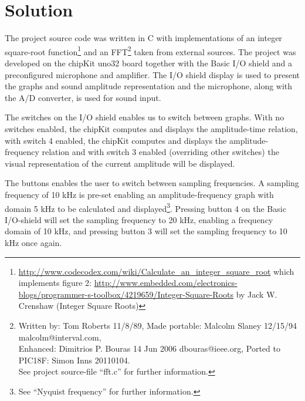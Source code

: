 \documentclass[a4paper,11pt]{article}
\begin{document}
\section*{Solution}
The project source code was written in C with implementations of an integer square-root function\footnote{\url{http://www.codecodex.com/wiki/Calculate_an_integer_square_root} which implements figure 2: \url{http://www.embedded.com/electronics-blogs/programmer-s-toolbox/4219659/Integer-Square-Roots} by Jack W. Crenshaw (Integer Square Roots)} 
and an FFT\footnote{Written by:  Tom Roberts  11/8/89, Made portable:  Malcolm Slaney 12/15/94 malcolm@interval.com, \\Enhanced:  Dimitrios P. Bouras  14 Jun 2006 dbouras@ieee.org, Ported to PIC18F:  Simon Inns 20110104.\\ See project source-file ``fft.c'' for further information.} 
taken from external sources. The project was developed on the chipKit uno32 board together with the Basic I/O shield and a preconfigured microphone and amplifier. The I/O shield display is used to present the graphs and sound amplitude representation and the microphone, along with the A/D converter, is used for sound input. 

The switches on the I/O shield enables us to switch between graphs. With no switches enabled, the chipKit computes and displays the amplitude-time relation, with switch 4 enabled, the chipKit computes and displays the amplitude-frequency relation and with switch 3 enabled (overriding other switches) the visual representation of the current amplitude will be displayed.

The buttons enables the user to switch between sampling frequencies. A sampling frequency of 10 kHz is pre-set enabling an amplitude-frequency graph with domain 5 kHz to be calculated and displayed\footnote{See ``Nyquist frequency'' for further information.}. Pressing button 4 on the Basic I/O-shield will set the sampling frequency to 20 kHz, enabling a frequency domain of 10 kHz, and pressing button 3 will set the sampling frequency to 10 kHz once again.
\end{document}
